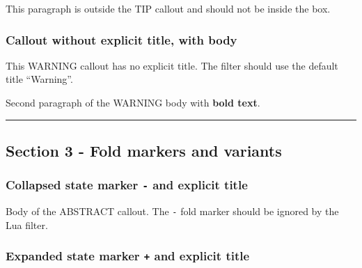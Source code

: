 This paragraph is outside the TIP callout and should not be inside the
box.

\subsubsection{Callout without explicit title, with
body}\label{inner-1-callout-without-explicit-title-with-body}

\begin{tcolorbox}[breakable,colback=ocOrgBack,colframe=ocOrgFrame,coltitle=ocOrgTitle,left=3mm,boxed title style={left=1mm},title={\hspace*{-2.5mm}\iconWarning\; Warning}]

This WARNING callout has no explicit title. The filter should use the
default title ``Warning''.

Second paragraph of the WARNING body with \textbf{bold text}.

\end{tcolorbox}

\begin{center}\rule{0.5\linewidth}{0.5pt}\end{center}

\subsection{Section 3 - Fold markers and
variants}\label{inner-1-section-3---fold-markers-and-variants}

\subsubsection{\texorpdfstring{Collapsed state marker \texttt{-} and
explicit
title}{Collapsed state marker - and explicit title}}\label{inner-1-collapsed-state-marker---and-explicit-title}

\begin{tcolorbox}[breakable,colback=ocGryBack,colframe=ocGryFrame,coltitle=ocGryTitle,left=3mm,boxed title style={left=1mm},title={\hspace*{-2.5mm}\iconTldr\; Abstract with fold marker}]

Body of the ABSTRACT callout. The \texttt{-} fold marker should be
ignored by the Lua filter.

\end{tcolorbox}

\subsubsection{\texorpdfstring{Expanded state marker \texttt{+} and
explicit
title}{Expanded state marker + and explicit title}}\label{inner-1-expanded-state-marker-and-explicit-title}

